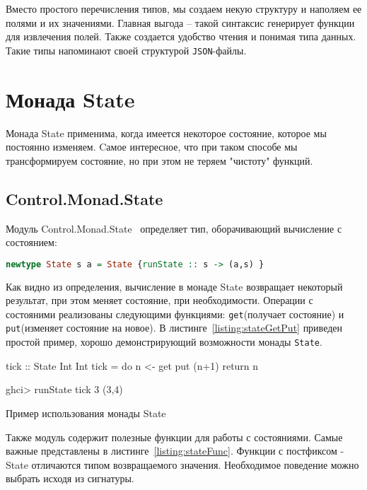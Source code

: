 Вместо простого перечисления типов, мы создаем некую структуру и наполяем ее полями и их значениями. Главная выгода – такой синтаксис генерирует функции для извлечения полей. Также создается удобство чтения и понимая типа данных. Такие типы напоминают своей структурой \lstinline{JSON}-файлы. 

\section{Монада State}

Монада State применима, когда имеется некоторое состояние, которое мы постоянно изменяем. Cамое интересное, что при таком способе мы трансформируем состояние, но при этом не теряем "чистоту" функций. 

\subsection{Control.Monad.State}

Модуль Control.Monad.State~\cite{stateControl} определяет тип, оборачивающий вычисление с состоянием:

\begin{lstlisting}[language=Haskell]
newtype State s a = State {runState :: s -> (a,s) }
\end{lstlisting} 

Как видно из определения, вычисление в монаде State возвращает некоторый результат, при этом меняет состояние, при необходимости. Операции с состояними реализованы следующими функциями: \lstinline{get}(получает состояние) и \lstinline{put}(изменяет состояние на новое). В листинге~\ref{listing:stateGetPut} приведен простой пример, хорошо демонстрирующий возможности монады \lstinline{State}.

\begin{ListingEnv}[H]
\begin{Verb}
tick :: State Int Int
tick = do n <- get
	  put (n+1)
          return n

ghci> runState tick 3
(3,4)
\end{Verb}
\caption{Пример использования монады State}
\label{listing:stateGetPut}
\end{ListingEnv}

Также модуль содержит полезные функции для работы с состояниями. Самые важные представлены в листинге~\ref{listing:stateFunc}. Функции с постфиксом -State отличаются типом возвращаемого значения. Необходимое поведение можно выбрать исходя из сигнатуры.

